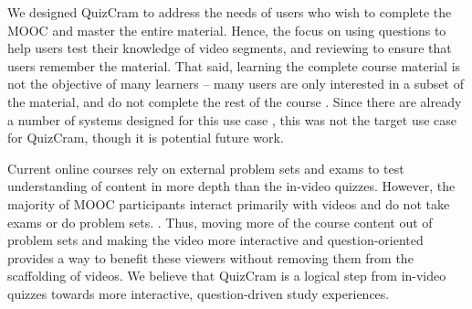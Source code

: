 \documentclass{sigchi}
\begin{document}
We designed QuizCram to address the needs of users who wish to complete the MOOC and master the entire material. Hence, the focus on using questions to help users test their knowledge of video segments, and reviewing to ensure that users remember the material. That said, learning the complete course material is not the objective of many learners  -- many users are only interested in a subset of the material, and do not complete the rest of the course \cite{deconstructing} \cite{anderson2014engaging}. Since there are already a number of systems designed for this use case \cite{panopticon} \cite{lecturescape}, this was not the target use case for QuizCram, though it is potential future work. %

Current online courses rely on external problem sets and exams to test understanding of content in more depth than the in-video quizzes. However, the majority of MOOC participants interact primarily with videos and do not take exams or do problem sets. \cite{anderson2014engaging}. Thus, moving more of the course content out of problem sets and making the video more interactive and question-oriented provides a way to benefit these viewers without removing them from the scaffolding of videos. We believe that QuizCram is a logical step from in-video quizzes towards more interactive, question-driven study experiences.

\end{document}
